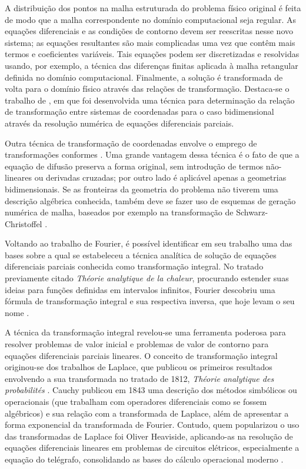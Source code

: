 A distribuição dos pontos na malha estruturada do problema físico original é feita de modo que a malha correspondente no domínio computacional seja regular. 
As equações diferenciais e as condições de contorno devem ser reescritas nesse novo sistema; as equações resultantes são mais complicadas uma vez que contêm mais
termos e coeficientes variáveis. Tais equações podem ser discretizadas e resolvidas usando, por exemplo, a técnica das diferenças finitas aplicada à malha retangular definida no domínio computacional.
Finalmente, a solução é transformada de volta para o domínio físico através das relações de transformação. Destaca-se o trabalho de \citet{artigo_thompson},
em que foi desenvolvida uma técnica para determinação da relação de transformação entre sistemas de coordenadas para o caso bidimensional através da resolução numérica de equações diferenciais parciais.

Outra técnica de transformação de coordenadas envolve o emprego de transformações conformes \citep{livro_numerical_grid}. Uma grande vantagem
dessa técnica é o fato de que a equação de difusão preserva a forma original, sem introdução de termos não-lineares ou derivadas cruzadas;
por outro lado é aplicável apenas a geometrias bidimensionais. Se as fronteiras da geometria do problema não tiverem uma descrição algébrica
conhecida, também deve se fazer uso de esquemas de geração numérica de malha, baseados por exemplo na transformação de Schwarz-Christoffel \citep{livro_brown}.

Voltando ao trabalho de Fourier, é possível identificar em seu trabalho uma das bases sobre a qual se estabeleceu a técnica analítica de solução
de equações diferenciais parciais conhecida como transformação integral. No tratado previamente citado \textit{Théorie analytique de la chaleur},
procurando estender suas ideias para funções definidas em intervalos infinitos, Fourier descobriu uma fórmula de transformação integral e
sua respectiva inversa, que hoje levam o seu nome \citep{livro_integral_transforms}.

A técnica da transformação integral revelou-se uma
ferramenta poderosa para resolver problemas de valor inicial e problemas de valor de contorno para equações diferenciais parciais lineares.
O conceito de transformação integral originou-se dos trabalhos de Laplace, que publicou os primeiros resultados envolvendo a sua transformada
no tratado de 1812, \textit{Théorie analytique des probabilités} \citep{livro_integral_transforms}. Cauchy publicou em 1843 uma descrição
dos métodos simbólicos ou operacionais (que trabalham com operadores diferenciais como se fossem algébricos) \citep{livro_cauchy} e sua relação com a transformada de
Laplace, além de apresentar a forma exponencial da transformada de Fourier. Contudo, quem popularizou o uso das transformadas de Laplace foi Oliver Heaviside,
aplicando-as na resolução de equações diferenciais lineares em problemas de circuitos elétricos, especialmente a equação do telégrafo, consolidando as bases do
cálculo operacional moderno \citep{livro_yavetz, artigo_carson}. 

